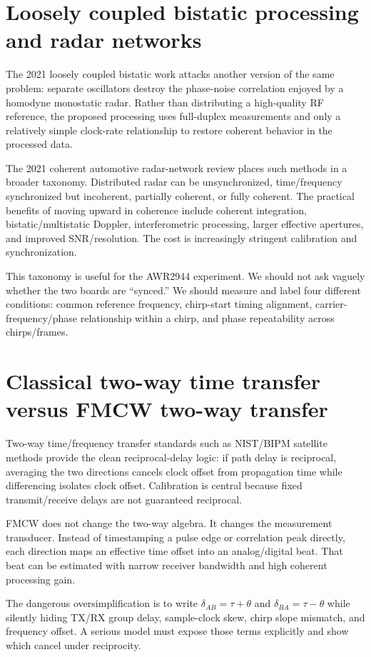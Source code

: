 \documentclass[11pt]{article}
\begin{document}
\section{Loosely coupled bistatic processing and radar networks}
The 2021 loosely coupled bistatic work attacks another version of the same problem: separate oscillators destroy the phase-noise correlation enjoyed by a homodyne monostatic radar. Rather than distributing a high-quality RF reference, the proposed processing uses full-duplex measurements and only a relatively simple clock-rate relationship to restore coherent behavior in the processed data.

The 2021 coherent automotive radar-network review places such methods in a broader taxonomy. Distributed radar can be unsynchronized, time/frequency synchronized but incoherent, partially coherent, or fully coherent. The practical benefits of moving upward in coherence include coherent integration, bistatic/multistatic Doppler, interferometric processing, larger effective apertures, and improved SNR/resolution. The cost is increasingly stringent calibration and synchronization.

This taxonomy is useful for the AWR2944 experiment. We should not ask vaguely whether the two boards are ``synced.'' We should measure and label four different conditions: common reference frequency, chirp-start timing alignment, carrier-frequency/phase relationship within a chirp, and phase repeatability across chirps/frames.

\section{Classical two-way time transfer versus FMCW two-way transfer}
Two-way time/frequency transfer standards such as NIST/BIPM satellite methods provide the clean reciprocal-delay logic: if path delay is reciprocal, averaging the two directions cancels clock offset from propagation time while differencing isolates clock offset. Calibration is central because fixed transmit/receive delays are not guaranteed reciprocal.

FMCW does not change the two-way algebra. It changes the measurement transducer. Instead of timestamping a pulse edge or correlation peak directly, each direction maps an effective time offset into an analog/digital beat. That beat can be estimated with narrow receiver bandwidth and high coherent processing gain.

The dangerous oversimplification is to write $\delta_{AB}=\tau+\theta$ and $\delta_{BA}=\tau-\theta$ while silently hiding TX/RX group delay, sample-clock skew, chirp slope mismatch, and frequency offset. A serious model must expose those terms explicitly and show which cancel under reciprocity.
\end{document}

